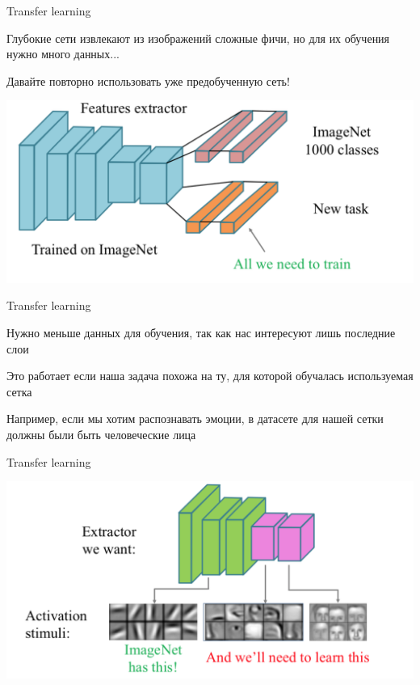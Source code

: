 \documentclass[notes,12pt, aspectratio=169]{beamer}
\newenvironment{wideitemize}{\itemize\addtolength{\itemsep}{10pt}}{\enditemize}
\begin{document}
\begin{frame}{Transfer learning}
\begin{wideitemize}
	\item  Глубокие сети извлекают из изображений сложные фичи, но для их обучения нужно много данных...
	\item  Давайте повторно использовать уже предобученную сеть!
\end{wideitemize}

\begin{center}
	\includegraphics[width=.8\linewidth]{transfer_learning2.png}
\end{center}
\end{frame}


\begin{frame}{Transfer learning}
\begin{wideitemize}
	\item  Нужно меньше данных для обучения, так как нас интересуют лишь последние слои
	\item  Это работает если наша задача похожа на ту, для которой обучалась используемая сетка
	\item  Например, если мы хотим распознавать эмоции, в датасете для нашей сетки должны были быть человеческие лица
\end{wideitemize}
\end{frame}


\begin{frame}{Transfer learning}
\begin{center}
	\includegraphics[width=.8\linewidth]{transfer_learning3.png}
\end{center}
\end{frame}
\end{document}
